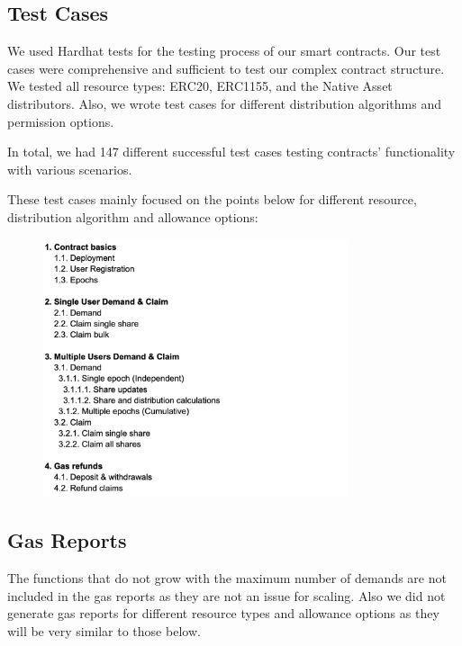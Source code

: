\documentclass[a4paper,12pt]{report}
\begin{document}
\subsection{Test Cases}
We used Hardhat tests for the testing process of our smart contracts. Our test cases were comprehensive and sufficient to test our complex contract structure. We tested all resource types: ERC20, ERC1155, and the Native Asset distributors. Also, we wrote test cases for different distribution algorithms and permission options. 

In total, we had 147 different successful test cases testing contracts’ functionality with various scenarios.

These test cases mainly focused on the points below for different resource, distribution algorithm and allowance options:

\begin{figure}[H]
	\centering
	\includegraphics[width=0.8\textwidth]{tests.png}
\end{figure}

\subsection{Gas Reports}
The functions that do not grow with the maximum number of demands are not included in the gas reports as they are not an issue for scaling. Also we did not generate gas reports for different resource types and allowance options as they will be very similar to those below.
\end{document}

